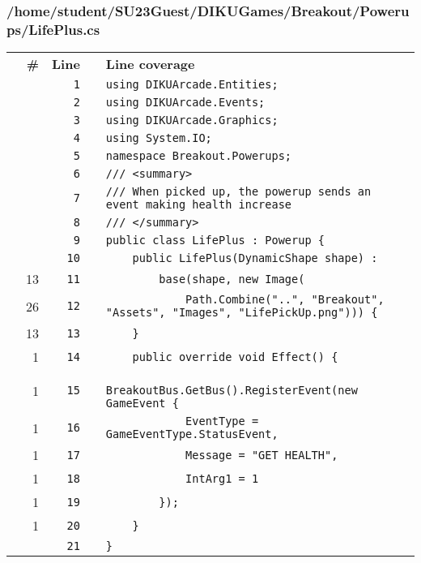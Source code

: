 \documentclass[a4paper,landscape,10pt]{article}
\begin{document}
\subsubsection{/home/student/SU23Guest/DIKUGames/Breakout/Powerups/LifePlus.cs}
\begin{longtable}[l]{lrrll}
\textbf{} & \textbf{\#} & \textbf{Line} & \textbf{} & \textbf{Line coverage}\\
\cellcolor{gray} &  & \verb~1~ & & \verb~using DIKUArcade.Entities;~\\
\cellcolor{gray} &  & \verb~2~ & & \verb~using DIKUArcade.Events;~\\
\cellcolor{gray} &  & \verb~3~ & & \verb~using DIKUArcade.Graphics;~\\
\cellcolor{gray} &  & \verb~4~ & & \verb~using System.IO;~\\
\cellcolor{gray} &  & \verb~5~ & & \verb~namespace Breakout.Powerups;~\\
\cellcolor{gray} &  & \verb~6~ & & \verb~/// <summary>~\\
\cellcolor{gray} &  & \verb~7~ & & \verb~/// When picked up, the powerup sends an event making health increase~\\
\cellcolor{gray} &  & \verb~8~ & & \verb~/// </summary>~\\
\cellcolor{gray} &  & \verb~9~ & & \verb~public class LifePlus : Powerup {~\\
\cellcolor{gray} &  & \verb~10~ & & \verb~    public LifePlus(DynamicShape shape) :~\\
\cellcolor{green} & 13 & \verb~11~ & & \verb~        base(shape, new Image(~\\
\cellcolor{green} & 26 & \verb~12~ & & \verb~            Path.Combine("..", "Breakout", "Assets", "Images", "LifePickUp.png"))) {~\\
\cellcolor{green} & 13 & \verb~13~ & & \verb~    }~\\
\cellcolor{green} & 1 & \verb~14~ & & \verb~    public override void Effect() {~\\
\cellcolor{green} & 1 & \verb~15~ & & \verb~        BreakoutBus.GetBus().RegisterEvent(new GameEvent {~\\
\cellcolor{green} & 1 & \verb~16~ & & \verb~            EventType = GameEventType.StatusEvent,~\\
\cellcolor{green} & 1 & \verb~17~ & & \verb~            Message = "GET HEALTH",~\\
\cellcolor{green} & 1 & \verb~18~ & & \verb~            IntArg1 = 1~\\
\cellcolor{green} & 1 & \verb~19~ & & \verb~        });~\\
\cellcolor{green} & 1 & \verb~20~ & & \verb~    }~\\
\cellcolor{gray} &  & \verb~21~ & & \verb~}~\\
\end{longtable}
\newpage
\end{document}

